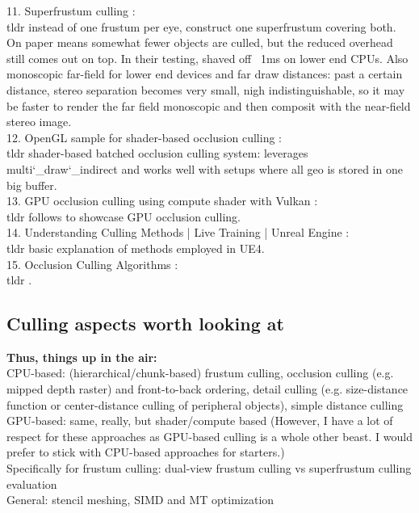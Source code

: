 11. Superfrustum culling \cite{Whiting.2017}: \\
tldr instead of one frustum per eye, construct one superfrustum covering both. On paper means somewhat fewer objects are culled, but the reduced overhead still comes out on top. In their testing, shaved off ~1ms on lower end CPUs. Also monoscopic far-field for lower end devices and far draw distances: past a certain distance, stereo separation becomes very small, nigh indistinguishable, so it may be faster to render the far field monoscopic and then composit with the near-field stereo image.\\

12. OpenGL sample for shader-based occlusion culling \cite{Kubisch.2014}: \\
tldr shader-based batched occlusion culling system: leverages multi\char`_draw\char`_indirect and works well with setups where all geo is stored in one big buffer.\\

13. GPU occlusion culling using compute shader with Vulkan \cite{sydneyzh.2018}: \\
tldr follows \cite{Anagnostou.2017} to showcase GPU occlusion culling.\\

14. Understanding Culling Methods | Live Training | Unreal Engine \cite{Hobson.2019}: \\
tldr basic explanation of methods employed in UE4.\\

15. Occlusion Culling Algorithms \cite{Haines.1999}: \\
tldr .\\

\subsection{Culling aspects worth looking at}
\textbf{Thus, things up in the air: }\\
CPU-based: (hierarchical/chunk-based) frustum culling, occlusion culling (e.g. mipped depth raster) and front-to-back ordering, detail culling (e.g. size-distance function or center-distance culling of peripheral objects), simple distance culling\\
GPU-based: same, really, but shader/compute based (However, I have a lot of respect for these approaches as GPU-based culling is a whole other beast. I would prefer to stick with CPU-based approaches for starters.)\\
Specifically for frustum culling: dual-view frustum culling vs superfrustum culling evaluation\\
General: stencil meshing, SIMD and MT optimization

